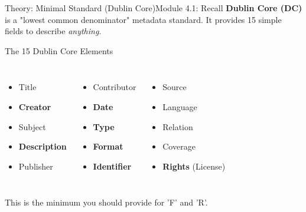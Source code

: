 \begin{frame}{Theory: Minimal Standard (Dublin Core)}{Module 4.1: Recall}
    \textbf{Dublin Core (DC)} is a "lowest common denominator" metadata standard. It provides 15 simple fields to describe \textit{anything}.
    
    \begin{block}{The 15 Dublin Core Elements}
        \begin{columns}
            \begin{itemize}
                \item Title
                \item \textbf{Creator}
                \item Subject
                \item \textbf{Description}
                \item Publisher
            \end{itemize}
            
            \begin{itemize}
                \item Contributor
                \item \textbf{Date}
                \item \textbf{Type}
                \item \textbf{Format}
                \item \textbf{Identifier}
            \end{itemize}
            
            \begin{itemize}
                \item Source
                \item Language
                \item Relation
                \item Coverage
                \item \textbf{Rights} (License)
            \end{itemize}
        \end{columns}
    \end{block}
    This is the minimum you should provide for 'F' and 'R'.
\end{frame}

